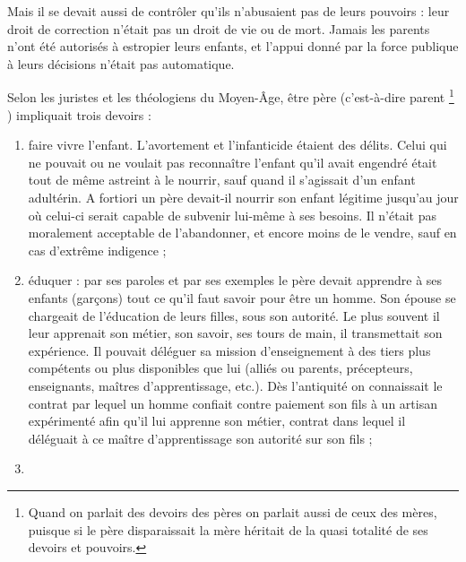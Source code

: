  Mais il se devait aussi de contrôler qu'ils n'abusaient pas de leurs pouvoirs : leur droit de correction n'était pas un droit de vie ou de mort. Jamais les parents n'ont été autorisés à estropier leurs enfants, et l'appui donné par la force publique à leurs décisions n'était pas automatique.

 Selon les juristes et les théologiens du Moyen-Âge, être père (c'est-à-dire parent%
\footnote{Quand on parlait des devoirs des pères on parlait aussi de ceux des mères, puisque si le père disparaissait la mère héritait de la quasi totalité de ses devoirs et pouvoirs.}%
) impliquait trois devoirs : 
\begin{enumerate}
\item %
faire vivre l'enfant. L'avortement et l'infanticide étaient des délits. Celui qui ne pouvait ou ne voulait pas reconnaître l'enfant qu'il avait engendré était tout de même astreint à le nourrir, sauf quand il s'agissait d'un enfant adultérin. A fortiori un père devait-il nourrir son enfant légitime jusqu'au jour où celui-ci serait capable de subvenir lui-même à ses besoins. Il n'était pas moralement acceptable de l'abandonner, et encore moins de le vendre, sauf en cas d'extrême indigence ;
\item %
éduquer : par ses paroles et par ses exemples le père devait apprendre à ses enfants (garçons) tout ce qu'il faut savoir pour être un homme. Son épouse se chargeait de l'éducation de leurs filles, sous son autorité. Le plus souvent il leur apprenait son métier, son savoir, ses tours de main, il transmettait son expérience. Il pouvait déléguer sa mission d'enseignement à des tiers plus compétents ou plus disponibles que lui (alliés ou parents, précepteurs, enseignants, maîtres d'apprentissage, etc.). Dès l'antiquité on connaissait le contrat par lequel un homme confiait contre paiement son fils à un artisan expérimenté afin qu'il lui apprenne son métier, contrat dans lequel il déléguait à ce maître d'apprentissage son autorité sur son fils ;
\item %

\end{enumerate}
